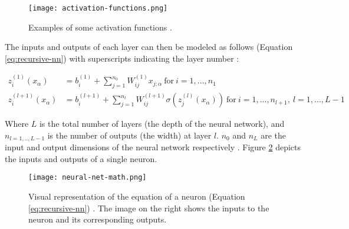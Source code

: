 \begin{figure}[ht]
    \centering
    \texttt{[image: activation-functions.png]}
    \caption{Examples of some activation functions \cite{robertsPrinciplesDeepLearning2022b}.}
    \label{fig:activation-function}
\end{figure}

The inputs and outputs of each layer can then be modeled as follows (Equation \ref{eq:recursive-nn}) with superscripts indicating the layer number \cite{robertsPrinciplesDeepLearning2022b}:

\begin{equation}
    \begin{split}
        \label{eq:recursive-nn}
        z_i^{(1)}(x_\alpha) &= b_i^{(1)} + \sum^{n_{0}}_{j=1}{W_{ij}^{(1)}x_{j;\alpha}} \: \text{for} \: i=1,...,n_{1} \\
        z_i^{(l+1)}(x_\alpha) &= b_i^{(l+1)} + \sum^{n_{l}}_{j=1}{W_{ij}^{(l+1)}\sigma(z_j^{(l)}(x_\alpha))} \: \text{for} \: i=1,...,n_{l+1}, \: l=1,...,L-1
    \end{split}
\end{equation}

Where $L$ is the total number of layers (the depth of the neural network), and $n_{l=1,..,L-1}$ is the number of outputs (the width) at layer $l$. $n_0$ and $n_L$ are the input and output dimensions of the neural network respectively \cite{robertsPrinciplesDeepLearning2022b}. Figure \ref{fig:neural-net-math} depicts the inputs and outputs of a single neuron. 


\begin{figure}[ht]
    \centering
    \texttt{[image: neural-net-math.png]}
    \caption{Visual representation of the equation of a neuron (Equation \ref{eq:recursive-nn}) \cite{robertsPrinciplesDeepLearning2022b}. The image on the right shows the inputs to the neuron and its corresponding outputs.}
    \label{fig:neural-net-math}
\end{figure}

\clearpage
